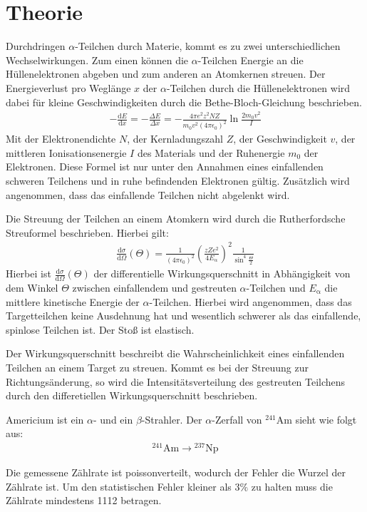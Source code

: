 \section{Theorie}
\label{sec:Theorie}

Durchdringen $\alpha$-Teilchen durch Materie, kommt es zu zwei unterschiedlichen Wechselwirkungen.
Zum einen können die $\alpha$-Teilchen Energie an die Hüllenelektronen abgeben und zum anderen
an Atomkernen streuen. Der Energieverlust pro Weglänge $x$ der $\alpha$-Teilchen durch die Hüllenelektronen wird dabei für
kleine Geschwindigkeiten durch die
Bethe-Bloch-Gleichung beschrieben.
\begin{align}
  -\frac{\mathrm{d}E}{\mathrm{d}x} =-\frac{\Delta E}{\Delta x}= - \frac{4\pi e^2 z^2 N Z}{m_{\mathrm{0}}v^2(4 \pi \epsilon_{\mathrm{0}})^2} \ln{\frac{2 m_{\mathrm{0}} v^2}{I}}
\end{align}
Mit der Elektronendichte $N$, der Kernladungszahl $Z$, der Geschwindigkeit $v$, der mittleren Ionisationsenergie $I$ des Materials
und der Ruhenergie $m_{\mathrm{0}}$ der Elektronen. Diese Formel ist nur unter den Annahmen eines einfallenden
schweren Teilchens und in ruhe befindenden Elektronen gültig. Zusätzlich wird angenommen, dass das einfallende Teilchen nicht
abgelenkt wird.

Die Streuung der Teilchen an einem Atomkern wird durch die Rutherfordsche Streuformel beschrieben. Hierbei gilt:
\begin{align}
  \frac{\mathrm{d}\sigma}{\mathrm{d}\Omega}(\Theta) = \frac{1}{(4 \pi \epsilon_{\mathrm{0}})^2} \left(\frac{z Z e^2}{4 E_{\mathrm{\alpha}}}\right)^2 \frac{1}{\sin^4{\frac{\Theta}{2}}}
  \label{eqn:rutherford}
\end{align}
Hierbei ist $\frac{\mathrm{d}\sigma}{\mathrm{d}\Omega}(\Theta)$ der differentielle Wirkungsquerschnitt in Abhängigkeit von dem Winkel $\Theta$
zwischen einfallendem und gestreuten $\alpha$-Teilchen und
$E_{\mathrm{\alpha}}$ die mittlere kinetische Energie der $\alpha$-Teilchen.
Hierbei wird angenommen, dass das Targetteilchen keine Ausdehnung hat und wesentlich schwerer
als das einfallende, spinlose Teilchen ist. Der Stoß ist elastisch.

Der Wirkungsquerschnitt beschreibt die Wahrscheinlichkeit eines einfallenden Teilchen an
einem Target zu streuen. Kommt es bei der Streuung zur Richtungsänderung, so wird
die Intensitätsverteilung des gestreuten Teilchens durch den differetiellen Wirkungsquerschnitt
beschrieben.

Americium ist ein $\alpha$- und ein $\beta$-Strahler. Der $\alpha$-Zerfall von ${}^{241}\mathrm{Am}$ sieht wie folgt aus:
\begin{align*}
  {}^{241}\mathrm{Am} \rightarrow {}^{237}\mathrm{Np}
\end{align*}

Die gemessene Zählrate ist poissonverteilt, wodurch der Fehler die Wurzel der Zählrate ist. Um den
statistischen Fehler kleiner als $3\%$ zu halten muss die Zählrate mindestens 1112 betragen.
